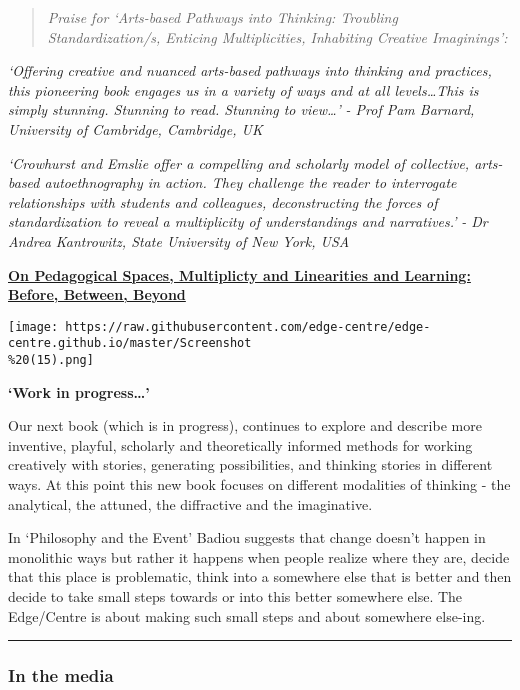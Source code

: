 \documentclass[
]{article}
\begin{document}
\begin{quote}
\emph{Praise for `Arts-based Pathways into Thinking: Troubling
Standardization/s, Enticing Multiplicities, Inhabiting Creative
Imaginings':}
\end{quote}

\emph{`Offering creative and nuanced arts-based pathways into thinking
and practices, this pioneering book engages us in a variety of ways and
at all levels\ldots This is simply stunning. Stunning to read. Stunning
to view\ldots{}'} \emph{- Prof Pam Barnard, University of Cambridge,
Cambridge, UK}

\emph{`Crowhurst and Emslie offer a compelling and scholarly model of
collective, arts-based autoethnography in action. They challenge the
reader to interrogate relationships with students and colleagues,
deconstructing the forces of standardization to reveal a multiplicity of
understandings and narratives.'} \emph{- Dr Andrea Kantrowitz, State
University of New York, USA}

\href{https://link.springer.com/book/10.1007/978-981-16-9400-4}{\textbf{On
Pedagogical Spaces, Multiplicty and Linearities and Learning: Before,
Between, Beyond}}

\texttt{[image: https://raw.githubusercontent.com/edge-centre/edge-centre.github.io/master/Screenshot\\\%20(15).png]}

\textbf{`Work in progress\ldots{}'}

Our next book (which is in progress), continues to explore and describe
more inventive, playful, scholarly and theoretically informed methods
for working creatively with stories, generating possibilities, and
thinking stories in different ways. At this point this new book focuses
on different modalities of thinking - the analytical, the attuned, the
diffractive and the imaginative.

In `Philosophy and the Event' Badiou suggests that change doesn't happen
in monolithic ways but rather it happens when people realize where they
are, decide that this place is problematic, think into a somewhere else
that is better and then decide to take small steps towards or into this
better somewhere else. The Edge/Centre is about making such small steps
and about somewhere else-ing.

\begin{center}\rule{0.5\linewidth}{0.5pt}\end{center}

\hypertarget{in-the-media}{%
\subsubsection{\texorpdfstring{In the media
}{In the media  }}\label{in-the-media}}
\end{document}
